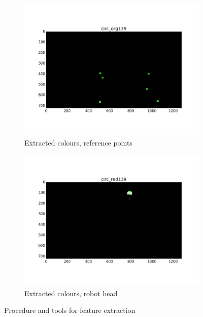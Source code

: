 \begin{figure}[htb]
\begin{subfigure}[b]{0.49\linewidth}
		\includegraphics[width=\linewidth]{files/_circ_org139.png}
		\caption{Extracted colours, reference points}
		\label{fig:circ_org}
	\end{subfigure}
	\begin{subfigure}[b]{0.49\linewidth}
        \centering
		\includegraphics[width=\linewidth]{files/_circ_red139.png}
		\caption{Extracted colours, robot head}
		\label{fig:circ_red}
	\end{subfigure}
	\caption{Procedure and tools for feature extraction} 
\end{figure}


